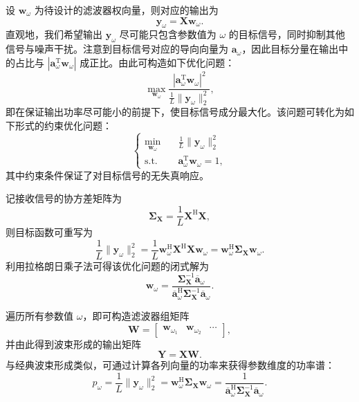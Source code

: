 设 \( \bm{w}_{\omega} \) 为待设计的滤波器权向量，则对应的输出为
\[
    \bm{y}_{\omega} = \mathbf{X} \bm{w}_{\omega}.
\]
直观地，我们希望输出 \(\bm{y}_{\omega}\) 尽可能只包含参数值为 \(\omega\) 的目标信号，同时抑制其他信号与噪声干扰。注意到目标信号对应的导向向量为 \(\bm{a}_{\omega}\)，因此目标分量在输出中的占比与 \(|\bm{a}_{\omega}^{\mathrm{T}} \bm{w}_{\omega}|\) 成正比。由此可构造如下优化问题：
\[
    \max_{\bm{w}_{\omega}} \frac{|\bm{a}_{\omega}^{\mathrm{T}} \bm{w}_{\omega}|^2}{ \frac{1}{L} \|\bm{y}_{\omega}\|_2^2},
\]
即在保证输出功率尽可能小的前提下，使目标信号成分最大化。该问题可转化为如下形式的约束优化问题：
\[
    \begin{cases}
        \min_{\bm{w}_{\omega}} \quad & \frac{1}{L} \|\bm{y}_{\omega}\|_2^2               \\
        \text{s.t.} \quad            & \bm{a}_{\omega}^{\mathrm{T}} \bm{w}_{\omega} = 1,
    \end{cases}
\]
其中约束条件保证了对目标信号的无失真响应。

记接收信号的协方差矩阵为
\[
    \mathbf{\Sigma}_{\mathbf{X}} = \frac{1}{L} \mathbf{X}^{\mathrm{H}} \mathbf{X},
\]
则目标函数可重写为
\[
    \frac{1}{L} \|\bm{y}_{\omega}\|_2^2
    = \frac{1}{L} \bm{w}_{\omega}^{\mathrm{H}} \mathbf{X}^{\mathrm{H}} \mathbf{X} \bm{w}_{\omega}
    = \bm{w}_{\omega}^{\mathrm{H}} \mathbf{\Sigma}_{\mathbf{X}} \bm{w}_{\omega}.
\]
利用拉格朗日乘子法可得该优化问题的闭式解为
\[
    \bm{w}_{\omega}
    = \frac{\mathbf{\Sigma}_{\mathbf{X}}^{-1} \overline{\bm{a}}_{\omega}}
    {\overline{\bm{a}}_{\omega}^{\mathrm{H}} \mathbf{\Sigma}_{\mathbf{X}}^{-1} \overline{\bm{a}}_{\omega}}.
\]

遍历所有参数值 \(\omega\)，即可构造滤波器组矩阵
\[
    \mathbf{W} = \begin{bmatrix} \bm{w}_{\omega_1} & \bm{w}_{\omega_2} & \cdots \end{bmatrix},
\]
并由此得到波束形成的输出矩阵
\[
    \mathbf{Y} = \mathbf{X} \mathbf{W}.
\]
与经典波束形成类似，可通过计算各列向量的功率来获得参数维度的功率谱：
\[
    p_{\omega}
    = \frac{1}{L} \|\bm{y}_{\omega}\|_2^2
    = \bm{w}_{\omega}^{\mathrm{H}} \mathbf{\Sigma}_{\mathbf{X}} \bm{w}_{\omega}
    = \frac{1}{\overline{\bm{a}}_{\omega}^{\mathrm{H}} \mathbf{\Sigma}_{\mathbf{X}}^{-1} \overline{\bm{a}}_{\omega}}.
\]

